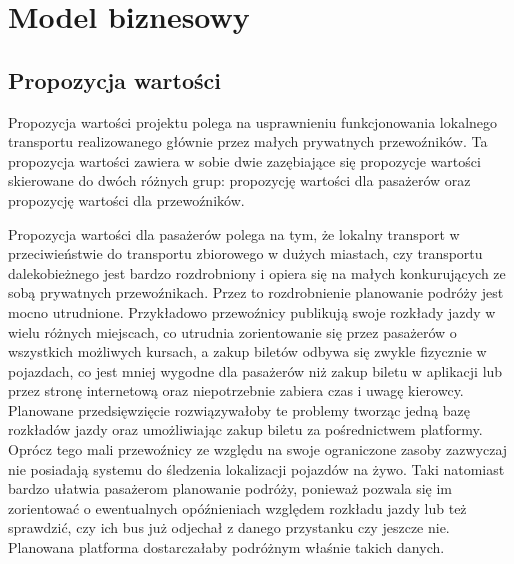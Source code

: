 \chapter{Model biznesowy}
\label{chap:drugi}



\section{Propozycja wartości}

Propozycja wartości projektu polega na usprawnieniu funkcjonowania lokalnego transportu realizowanego głównie przez małych prywatnych przewoźników. Ta propozycja wartości zawiera w sobie dwie zazębiające się propozycje wartości skierowane do dwóch różnych grup: propozycję wartości dla pasażerów oraz propozycję wartości dla przewoźników.

Propozycja wartości dla pasażerów polega na tym, że lokalny transport w przeciwieństwie do transportu zbiorowego w dużych miastach, czy transportu dalekobieżnego jest bardzo rozdrobniony i opiera się na małych konkurujących ze sobą prywatnych przewoźnikach. Przez to rozdrobnienie planowanie podróży jest mocno utrudnione. Przykładowo przewoźnicy publikują swoje rozkłady jazdy w wielu różnych miejscach, co utrudnia zorientowanie się przez pasażerów o wszystkich możliwych kursach, a zakup biletów odbywa się zwykle fizycznie w pojazdach, co jest mniej wygodne dla pasażerów niż zakup biletu w aplikacji lub przez stronę internetową oraz niepotrzebnie zabiera czas i uwagę kierowcy. Planowane przedsięwzięcie rozwiązywałoby te problemy tworząc jedną bazę rozkładów jazdy oraz umożliwiając zakup biletu za pośrednictwem platformy. Oprócz tego mali przewoźnicy ze względu na swoje ograniczone zasoby zazwyczaj nie posiadają systemu do śledzenia lokalizacji pojazdów na żywo. Taki natomiast bardzo ułatwia pasażerom planowanie podróży, ponieważ pozwala się im zorientować o ewentualnych opóźnieniach względem rozkładu jazdy lub też sprawdzić, czy ich bus już odjechał z danego przystanku czy jeszcze nie. Planowana platforma dostarczałaby podróżnym właśnie takich danych.

